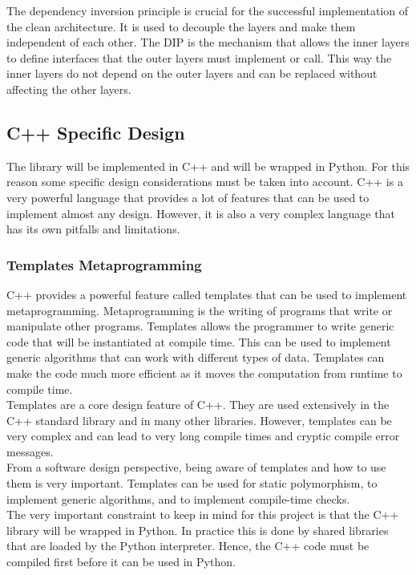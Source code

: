 \begin{spacing}{1.2}
    The dependency inversion principle is crucial for the successful implementation of the clean architecture.
    It is used to decouple the layers and make them independent of each other. The DIP is the mechanism
    that allows the inner layers to define interfaces that the outer layers must implement or call.
    This way the inner layers do not depend on the outer layers and can be replaced without affecting the other layers.

    \subsection{C++ Specific Design}
    The library will be implemented in C++ and will be wrapped in Python. For this reason
    some specific design considerations must be taken into account. C++ is a very powerful
    language that provides a lot of features that can be used to implement almost any design.
    However, it is also a very complex language that has its own pitfalls and limitations.

    \subsubsection{Templates Metaprogramming}
    C++ provides a powerful feature called templates that can be used to implement metaprogramming.
    Metaprogramming is the writing of programs that write or manipulate other programs.
    Templates allows the programmer to write generic code that will be instantiated at compile time.
    This can be used to implement generic algorithms that can work with different types of data.
    Templates can make the code much more efficient as it moves the computation from runtime
    to compile time. \\

    Templates are a core design feature of C++. They are used extensively in the C++ standard
    library and in many other libraries. However, templates can be very complex and can lead to
    very long compile times and cryptic compile error messages.\\

    From a software design perspective, being aware of templates and how to use them is very
    important. Templates can be used for static polymorphism, to implement generic algorithms,
    and to implement compile-time checks.\\

    The very important constraint to keep in mind for this project is that the C++ library will
    be wrapped in Python. In practice this is done by shared libraries that are loaded by the Python
    interpreter. Hence, the C++ code must be compiled first before it can be used in Python.


\end{spacing}
